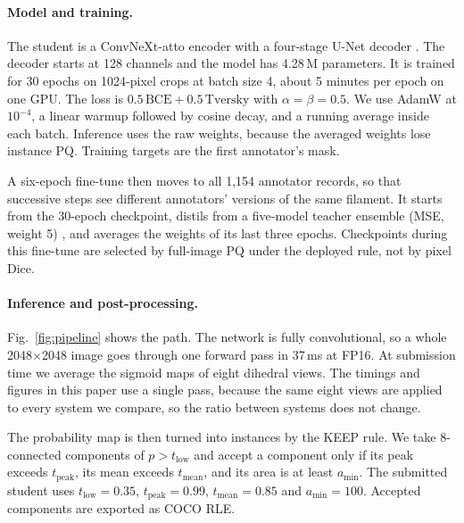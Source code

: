 \documentclass[sigconf]{acmart}
\begin{document}
\paragraph{Model and training.}
The student is a ConvNeXt-atto encoder \cite{liu2022convnext} with a four-stage
U-Net decoder \cite{ronneberger2015unet}. The decoder starts at 128 channels and
the model has 4.28\,M parameters. It is trained for 30 epochs on 1024-pixel
crops at batch size 4, about 5 minutes per epoch on one GPU. The loss is
$0.5\,\mathrm{BCE}+0.5\,\mathrm{Tversky}$ with $\alpha=\beta=0.5$. We use AdamW
at $10^{-4}$, a linear warmup followed by cosine decay, and a running average
inside each batch. Inference uses the raw weights, because the averaged weights
lose instance PQ. Training targets are the first annotator's mask.

A six-epoch fine-tune then moves to all 1{,}154 annotator records, so that
successive steps see different annotators' versions of the same filament. It
starts from the 30-epoch checkpoint, distils from a five-model teacher ensemble
(MSE, weight 5) \cite{hinton2015distilling}, and averages the weights of its
last three epochs. Checkpoints during this fine-tune are selected by full-image
PQ under the deployed rule, not by pixel Dice.

\paragraph{Inference and post-processing.}
Fig.~\ref{fig:pipeline} shows the path. The network is fully convolutional, so a
whole 2048$\times$2048 image goes through one forward pass in 37\,ms at FP16. At
submission time we average the sigmoid maps of eight dihedral views. The timings
and figures in this paper use a single pass, because the same eight views are
applied to every system we compare, so the ratio between systems does not change.

The probability map is then turned into instances by the KEEP rule. We take
8-connected components of $p>t_{\mathrm{low}}$ and accept a component only if its
peak exceeds $t_{\mathrm{peak}}$, its mean exceeds $t_{\mathrm{mean}}$, and its
area is at least $a_{\mathrm{min}}$. The submitted student uses
$t_{\mathrm{low}}=0.35$, $t_{\mathrm{peak}}=0.99$, $t_{\mathrm{mean}}=0.85$ and
$a_{\mathrm{min}}=100$. Accepted components are exported as COCO RLE.
\end{document}
